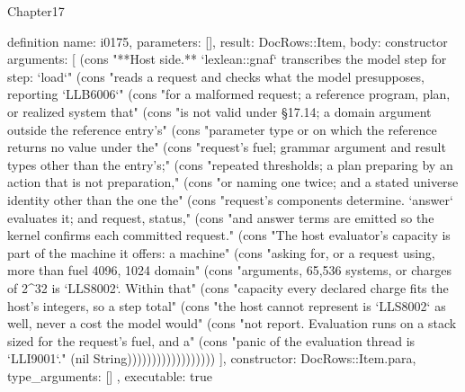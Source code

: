 \begin{lexlean}{Chapter17}
\begin{semanticmodule}
definition{
  name: i0175,
  parameters: [],
  result: DocRows::Item,
  body: constructor{
    arguments: [
      (cons "**Host side.** `lexlean::gnaf` transcribes the model step for step: `load`" (cons "reads a request and checks what the model presupposes, reporting `LLB6006`" (cons "for a malformed request; a reference program, plan, or realized system that" (cons "is not valid under §17.14; a domain argument outside the reference entry's" (cons "parameter type or on which the reference returns no value under the" (cons "request's fuel; grammar argument and result types other than the entry's;" (cons "repeated thresholds; a plan preparing by an action that is not preparation," (cons "or naming one twice; and a stated universe identity other than the one the" (cons "request's components determine. `answer` evaluates it; and request, status," (cons "and answer terms are emitted so the kernel confirms each committed request." (cons "The host evaluator's capacity is part of the machine it offers: a machine" (cons "asking for, or a request using, more than fuel 4096, 1024 domain" (cons "arguments, 65,536 systems, or charges of 2^32 is `LLS8002`. Within that" (cons "capacity every declared charge fits the host's integers, so a step total" (cons "the host cannot represent is `LLS8002` as well, never a cost the model would" (cons "not report. Evaluation runs on a stack sized for the request's fuel, and a" (cons "panic of the evaluation thread is `LLI9001`." (nil String))))))))))))))))))
    ],
    constructor: DocRows::Item.para,
    type_arguments: []
  },
  executable: true
}


\end{semanticmodule}
\end{lexlean}
